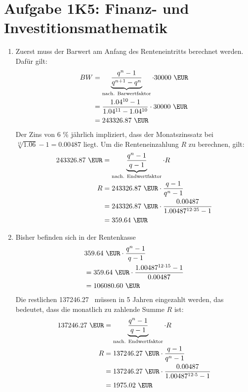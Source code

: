 \documentclass{article}
\begin{document}
	\section*{Aufgabe 1K5: Finanz- und Investitionsmathematik}
	\begin{enumerate}[label=(\alph*)]
		\item Zuerst muss der Barwert am Anfang des Renteneintritts berechnet werden. Dafür gilt:
		\begin{align}
			BW &= \underbrace{\frac{q^n-1}{q^{n+1}-q^n}}_{\text{nach. Barwertfaktor}} \cdot 30000 \text{ \EUR} \notag \\
			&= \frac{1.04^{10}-1}{1.04^{11} - 1.04^{10}} \cdot 30000 \text{ \EUR} \notag \\
			&= 243326.87 \text{ \EUR} \notag
		\end{align}
		Der Zins von 6 \% jährlich impliziert, dass der Monatszinssatz bei $\sqrt[12]{1.06}-1=0.00487$ liegt. Um die Renteneinzahlung $R$ zu berechnen, gilt:
		\begin{align}
			243326.87 \text{ \EUR} &= \underbrace{\frac{q^n-1}{q-1}}_{\text{nach. Endwertfaktor}} \cdot R \notag \\
			R &= 243326.87 \text{ \EUR} \cdot \frac{q-1}{q^n-1} \notag \\
			&= 243326.87 \text{ \EUR} \cdot \frac{0.00487}{1.00487^{12\cdot 25}-1} \notag \\
			&=  359.64 \text{ \EUR} \notag
		\end{align}
		\item Bisher befinden sich in der Rentenkasse
		\begin{align}
			& 359.64 \text{ \EUR} \cdot \frac{q^n-1}{q-1} \notag \\
			&= 359.64 \text{ \EUR} \cdot \frac{1.00487^{12\cdot 15}-1}{0.00487} \notag \\
			&= 106080.60 \text{ \EUR} \notag
		\end{align}
		Die restlichen 137246.27 \EUR\, müssen in 5 Jahren eingezahlt werden, das bedeutet, dass die monatlich zu zahlende Summe $R$ ist:
		\begin{align}
			137246.27 \text{ \EUR} &= \underbrace{\frac{q^n-1}{q-1}}_{\text{nach. Endwertfaktor}} \cdot R \notag \\
			R &= 137246.27 \text{ \EUR} \cdot \frac{q-1}{q^n-1} \notag \\
			&= 137246.27 \text{ \EUR} \cdot \frac{0.00487}{1.00487^{12\cdot 5}-1} \notag \\
			&= 1975.02 \text{ \EUR} \notag
		\end{align}

\end{enumerate}
\end{document}
